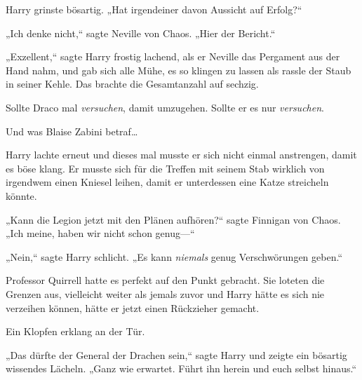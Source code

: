 Harry grinste bösartig. „Hat irgendeiner davon Aussicht auf Erfolg?“

„Ich denke nicht,“ sagte Neville von Chaos. „Hier der Bericht.“

„Exzellent,“ sagte Harry frostig lachend, als er Neville das Pergament aus der Hand nahm, und gab sich alle Mühe, es so klingen zu lassen als rassle der Staub in seiner Kehle. Das brachte die Gesamtanzahl auf sechzig.

Sollte Draco mal \emph{versuchen}, damit umzugehen. Sollte er es nur \emph{versuchen}.

Und was Blaise Zabini betraf…

Harry lachte erneut und dieses mal musste er sich nicht einmal anstrengen, damit es böse klang. Er musste sich für die Treffen mit seinem Stab wirklich von irgendwem einen Kniesel leihen, damit er unterdessen eine Katze streicheln könnte.

„Kann die Legion jetzt mit den Plänen aufhören?“ sagte Finnigan von Chaos. „Ich meine, haben wir nicht schon genug—“

„Nein,“ sagte Harry schlicht. „Es kann \emph{niemals} genug Verschwörungen geben.“

Professor Quirrell hatte es perfekt auf den Punkt gebracht. Sie loteten die Grenzen aus, vielleicht weiter als jemals zuvor und Harry hätte es sich nie verzeihen können, hätte er jetzt einen Rückzieher gemacht.

Ein Klopfen erklang an der Tür.

„Das dürfte der General der Drachen sein,“ sagte Harry und zeigte ein bösartig wissendes Lächeln. „Ganz wie erwartet. Führt ihn herein und euch selbst hinaus.“

